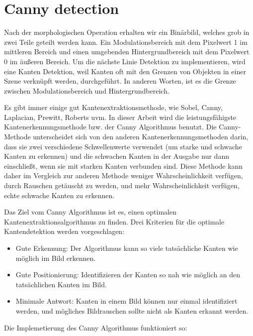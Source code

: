 \section{Canny detection}

Nach der morphologischen Operation erhalten wir ein Binärbild, welches grob in zwei Teile geteilt werden kann. Ein Modulationsbereich mit dem Pixelwert 1 im mittleren Bereich und einen umgebenden Hintergrundbereich mit dem Pixelwert 0 im äußeren Bereich. Um die nächste Linie Detektion zu implementieren, wird eine Kanten Detektion, weil Kanten oft mit den Grenzen von Objekten in einer Szene verknüpft werden, durchgeführt. In anderen Worten, ist es die Grenze zwischen Modulationsbereich und Hintergrundbereich. \cite{canny}

Es gibt immer einige gut Kantenextraktionsmethode, wie Sobel, Canny, Laplacian, Prewitt, Roberts uvm. In dieser Arbeit wird die leistungsfähigste Kantenerkennungsmethode bzw. der Canny Algorithmus benutzt. Die Canny-Methode unterscheidet sich von den anderen Kantenerkennungsmethoden darin, dass sie zwei verschiedene Schwellenwerte verwendet (um starke und schwache Kanten zu erkennen) und die schwachen Kanten in der Ausgabe nur dann einschließt, wenn sie mit starken Kanten verbunden sind. Diese Methode kann daher im Vergleich zur anderen Methode weniger Wahrscheinlichkeit verfügen, durch Rauschen getäuscht zu werden, und mehr Wahrscheinlichkeit verfügen, echte schwache Kanten zu erkennen.

Das Ziel vom Canny Algorithmus ist es, einen optimalen Kantenextraktionsalgorithmus zu finden. Drei Kriterien für die optimale Kantendetektion werden vorgeschlagen:

\begin{itemize}

\item Gute Erkennung: Der Algorithmus kann so viele tatsächliche Kanten wie möglich im Bild erkennen.
\item Gute Positionierung: Identifizieren der Kanten so nah wie möglich an den tatsächlichen Kanten im Bild.
\item Minimale Antwort: Kanten in einem Bild können nur einmal identifiziert werden, und mögliches Bildrauschen sollte nicht als Kanten erkannt werden.

\end{itemize}

Die Implemetierung des Canny Algorithmus funktioniert so:

